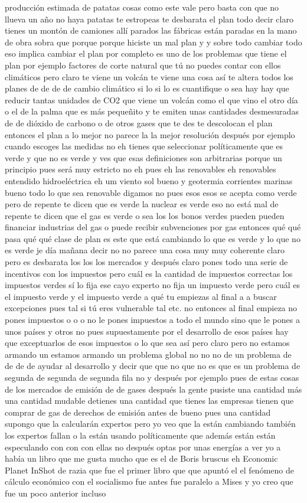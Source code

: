 producción estimada de patatas cosas como este vale pero basta con que no llueva un año no haya patatas te estropeas te desbarata el plan todo decir claro tienes un montón de camiones allí parados las fábricas están paradas en la mano de obra sobra que porque porque hiciste un mal plan y y sobre todo cambiar todo eso implica cambiar el plan por completo es uno de los problemas que tiene el plan por ejemplo factores de corte natural que tú no puedes contar con ellos climáticos pero claro te viene un volcán te viene una cosa así te altera todos los planes de de de de cambio climático si lo si lo es cuantifique o sea hay hay que reducir tantas unidades de CO2 que viene un volcán como el que vino el otro día o el de la palma que es más pequeñito y te emiten unas cantidades desmesuradas de de dióxido de carbono o de otros gases que te des te descolocan el plan entonces el plan a lo mejor no parece la la mejor resolución después por ejemplo cuando escoges las medidas no eh tienes que seleccionar políticamente que es verde y que no es verde y ves que esas definiciones son arbitrarias porque un principio pues será muy estricto no eh pues eh las renovables eh renovables entendido hidroeléctrica eh um viento sol bueno y geotermia corrientes marinas bueno todo lo que sea renovable digamos no pues esos esos se acepta como verde pero de repente te dicen que es verde la nuclear es verde eso no está mal de repente te dicen que el gas es verde o sea los los bonos verdes pueden pueden financiar industrias del gas o puede recibir subvenciones por gas entonces qué qué pasa qué qué clase de plan es este que está cambiando lo que es verde y lo que no es verde je día mañana decir no no parece una cosa muy muy coherente claro pero es desbarata los los los mercados y después claro pones todo una serie de incentivos con los impuestos pero cuál es la cantidad de impuestos correctas los impuestos verdes sí lo fija ese cayo experto no fija un impuesto verde pero cuál es el impuesto verde y el impuesto verde a qué tu empiezas al final a a buscar excepciones pues tal si tú eres vulnerable tal etc. no entonces al final empieza no pones impuestos o o o no le pones impuestos a todo el mundo sino que le pones a unos países y otros no pues supuestamente por el desarrollo de esos países hay que exceptuarlos de esos impuestos o lo que sea así pero claro pero no estamos armando un estamos armando un problema global no no no de un problema de de de de ayudar al desarrollo y decir que que no que no es que es un problema de segunda de segunda de segunda fila no y después por ejemplo pues de estas cosas de los mercados de emisión de de gases después la gente pusiste una cantidad más una cantidad mudable detienes una cantidad que tienes las empresas tienen que comprar de gas de derechos de emisión antes de bueno pues una cantidad supongo que la calcularán expertos pero yo veo que la están cambiando también los expertos fallan o la están usando políticamente que además están están especulando con con con ellas no después optas por unas energías a ver yo a había un libro que me gusta mucho que es el de Boris bruscus eh Economic Planet InShot de razia que fue el primer libro que que apuntó el el fenómeno de cálculo económico con el socialismo fue antes fue paralelo a Mises y yo creo que fue un poco anterior incluso 